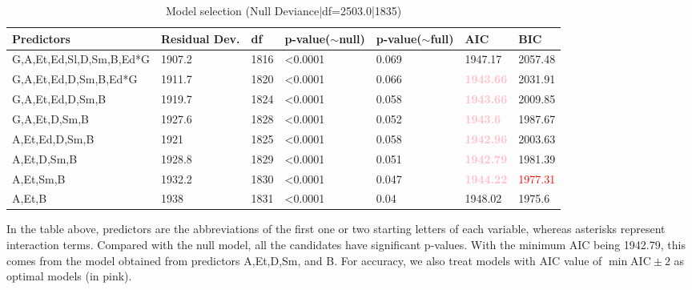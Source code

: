 \documentclass[12pt]{article}
\begin{document}

\begin{table}[!ht]
\caption{Model selection (Null Deviance|df=2503.0|1835)}
    \centering
    \small
    \begin{tabular}{lllllll}
    \hline
    \hline
        \textbf{Predictors} & \textbf{Residual Dev.} & \textbf{df} & \textbf{p-value($\sim$null)} & \textbf{p-value($\sim$full)} & \textbf{AIC} & \textbf{BIC} \\ \hline
        G,A,Et,Ed,Sl,D,Sm,B,Ed*G & 1907.2 & 1816 & <0.0001 & 0.069 & 1947.17 & 2057.48  \\ \hline
        G,A,Et,Ed,D,Sm,B,Ed*G & 1911.7 & 1820 & <0.0001 & 0.066 & \textcolor{pink}{\textbf{1943.66}} & 2031.91  \\ \hline
        G,A,Et,Ed,D,Sm,B & 1919.7 & 1824 & <0.0001 & 0.058 & \textcolor{pink}{\textbf{1943.66}} & 2009.85  \\ \hline
        G,A,Et,D,Sm,B & 1927.6 & 1828 & <0.0001 & 0.052 & \textcolor{pink}{\textbf{1943.6}} & 1987.67  \\ \hline
        A,Et,Ed,D,Sm,B & 1921 & 1825 & <0.0001 & 0.058 & \textcolor{pink}{\textbf{1942.96}} & 2003.63  \\ \hline
        A,Et,D,Sm,B & 1928.8 & 1829 & <0.0001 & 0.051 & \textcolor{pink}{\textbf{1942.79}} & 1981.39  \\ \hline
        A,Et,Sm,B & 1932.2 & 1830 & <0.0001 & 0.047 & \textcolor{pink}{\textbf{1944.22}} & \textcolor{red}{1977.31}  \\ \hline
        A,Et,B & 1938 & 1831 & <0.0001 & 0.04 & 1948.02 & 1975.6  \\ \hline
        \hline
    \end{tabular}
\end{table}



In the table above, predictors are the abbreviations of the first one or two starting letters of each variable, whereas asterisks represent interaction terms. Compared with the null model, all the candidates have significant p-values. With the minimum AIC being 1942.79, this comes from the model obtained from predictors A,Et,D,Sm, and B. For accuracy, we also treat models with AIC value of $\min{\text{AIC}} \pm 2$ as optimal models (in pink). \\
\end{document}
